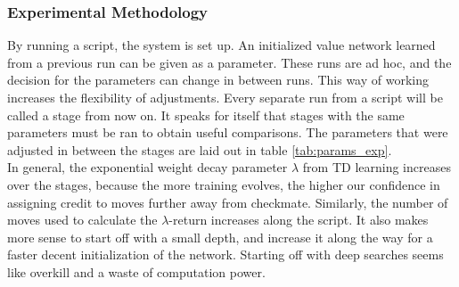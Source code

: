 \subsubsection*{Experimental Methodology}
By running a script, the system is set up. An initialized value network learned from a previous run can be given as a parameter. These runs are ad hoc, and the decision for the parameters can change in between runs. This way of working increases the flexibility of adjustments. Every separate run from a script will be called a stage from now on. It speaks for itself that stages with the same parameters must be ran to obtain useful comparisons. The parameters that were adjusted in between the stages are laid out in table \ref{tab:params_exp}. \\

In general, the exponential weight decay parameter $\lambda$ from TD learning increases over the stages, because the more training evolves, the higher our confidence in assigning credit to moves further away from checkmate. Similarly, the number of moves used to calculate the $\lambda$-return increases along the script. It also makes more sense to start off with a small depth, and increase it along the way for a faster decent initialization of the network. Starting off with deep searches seems like overkill and a waste of computation power.

